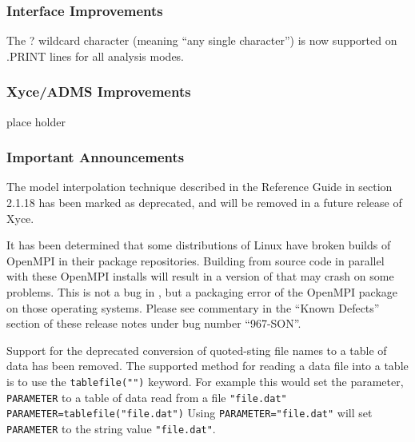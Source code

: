 \documentclass[letterpaper]{scrartcl}
\begin{document}
\subsubsection*{Interface Improvements}
\begin{XyceItemize}
  \item The ? wildcard character (meaning ``any single character'') is now
supported on .PRINT lines for all analysis modes.
\end{XyceItemize}

\subsubsection*{Xyce/ADMS Improvements}
\begin{XyceItemize}
  \item place holder
\end{XyceItemize}

\subsubsection*{Important Announcements}
\begin{XyceItemize}
\item The model interpolation technique described in the \Xyce{}
  Reference Guide in section 2.1.18 has been marked as deprecated, and
  will be removed in a future release of Xyce.
\item It has been determined that some distributions of Linux have
  broken builds of OpenMPI in their package repositories.  Building
  \Xyce{} from source code in parallel with these OpenMPI installs
  will result in a version of \Xyce{} that may crash on some problems.
  This is not a bug in \Xyce{}, but a packaging error of the OpenMPI
  package on those operating systems.  Please see commentary in the
  ``Known Defects'' section of these release notes under bug number
  ``967-SON''.
 \item Support for the deprecated conversion of quoted-sting file 
  names to a table of data has been removed.  The supported method
  for reading a data file into a table is to use the \texttt{tablefile("")} keyword. 
  For example this would set the parameter, \texttt{PARAMETER} to a table 
  of data read from a file \texttt{"file.dat"}
  \texttt{PARAMETER=tablefile("file.dat")} 
  Using \texttt{PARAMETER="file.dat"} will set \texttt{PARAMETER} to the
  string value \texttt{"file.dat"}.
\end{XyceItemize}

\newpage
\end{document}
